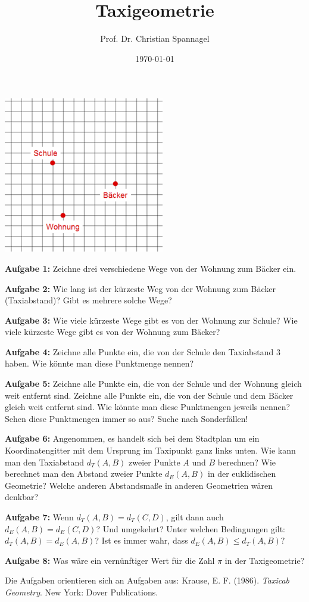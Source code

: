 \documentclass{../cssheet}
\title{Taxigeometrie}
\author{Prof. Dr. Christian Spannagel}
\date{\today}
\begin{document}
\printtitle

\begin{center}
\includegraphics[width=7cm]{stadtplan.png}
\end{center}

\textbf{Aufgabe 1:}  Zeichne drei verschiedene Wege von der Wohnung zum Bäcker ein.

\textbf{Aufgabe 2:}  Wie lang ist der kürzeste Weg von der Wohnung zum Bäcker (\glqq{}Taxiabstand\grqq{})? Gibt es mehrere solche Wege?

\textbf{Aufgabe 3:}  Wie viele kürzeste Wege gibt es von der Wohnung zur Schule? Wie viele kürzeste Wege gibt es von der Wohnung zum Bäcker? 

\textbf{Aufgabe 4:} Zeichne alle Punkte ein, die von der Schule den Taxiabstand $3$ haben. Wie könnte man diese Punktmenge nennen?

\textbf{Aufgabe 5:} Zeichne alle Punkte ein, die von der Schule und der Wohnung gleich weit entfernt sind. Zeichne alle Punkte ein, die von der Schule und dem Bäcker gleich weit entfernt sind. Wie könnte man diese Punktmengen jeweils nennen? Sehen diese Punktmengen immer \glqq{}so\grqq{} aus? Suche nach Sonderfällen!

\textbf{Aufgabe 6:} Angenommen, es handelt sich bei dem Stadtplan um ein Koordinatengitter mit dem Ursprung im Taxipunkt ganz links unten. Wie kann man den Taxiabstand $d_T(A,B)$ zweier Punkte $A$ und $B$ berechnen? Wie berechnet man den Abstand zweier Punkte $d_E(A,B)$ in der euklidischen Geometrie? Welche anderen Abstandsmaße in anderen Geometrien wären denkbar?

\textbf{Aufgabe 7:} Wenn $d_T(A,B) = d_T(C,D)$, gilt dann auch $d_E(A,B)=d_E(C,D)$? Und umgekehrt? Unter welchen Bedingungen gilt: $d_T(A,B) = d_E(A,B)$? Ist es immer wahr, dass $d_E(A,B) \leq d_T(A,B)?$

\textbf{Aufgabe 8:} Was wäre ein vernünftiger Wert für die Zahl $\pi$ in der Taxigeometrie? 

Die Aufgaben orientieren sich an Aufgaben aus: Krause, E. F. (1986). \emph{Taxicab Geometry}. New York: Dover Publications.


\newpage

\printlicense

\printsocials
\end{document}
